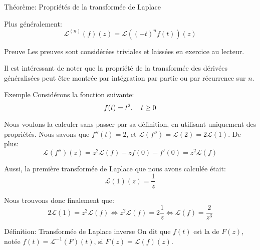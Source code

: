 \documentclass[a4paper]{article}
\begin{document}
\begin{parag}{Théorème: Propriétés de la transformée de Laplace}
\begin{itemize}
        Plus généralement:  
        \[\mathcal{L}^{\left(n\right)}\left(f\right)\left(z\right) = \mathcal{L}\left(\left(-t\right)^n f\left(t\right)\right)\left(z\right)\] 
    \end{itemize}

    \begin{subparag}{Preuve}
        Les preuves sont considérées triviales et laissées en exercice au lecteur.

        Il est intéressant de noter que la propriété de la transformée des dérivées généralisées peut être montrée par intégration par partie ou par récurrence sur $n$.
    \end{subparag}
\end{parag}

\begin{parag}{Exemple}
    Considérons la fonction suivante: 
    \[f\left(t\right) = t^2, \mathspace t \geq 0\]
    
    Nous voulons la calculer sans passer par sa définition, en utilisant uniquement des propriétés. Nous savons que $f''\left(t\right) = 2$, et $\mathcal{L}\left(f''\right) = \mathcal{L}\left(2\right) = 2 \mathcal{L}\left(1\right)$. De plus: 
    \[\mathcal{L}\left(f''\right)\left(z\right) = z^2 \mathcal{L}\left(f\right) - z f\left(0\right) - f'\left(0\right) = z^2 \mathcal{L}\left(f\right)\]

    Aussi, la première transformée de Laplace que nous avons calculée était:
    \[\mathcal{L}\left(1\right)\left(z\right) = \frac{1}{z}\]

    Nous trouvons donc finalement que: 
    \[2 \mathcal{L}\left(1\right) = z^2 \mathcal{L}\left(f\right) \iff z^2 \mathcal{L}\left(f\right) = 2 \frac{1}{z} \iff \mathcal{L}\left(f\right) = \frac{2}{z^3}\]
\end{parag}

\begin{parag}{Définition: Transformée de Laplace inverse}
    On dit que $f\left(t\right)$ est la  de $F\left(z\right)$, notée $f\left(t\right) = \mathcal{L}^{-1}\left(F\right)\left(t\right)$, si $F\left(z\right) = \mathcal{L}\left(f\right)\left(z\right)$.
\end{parag}
\end{document}
